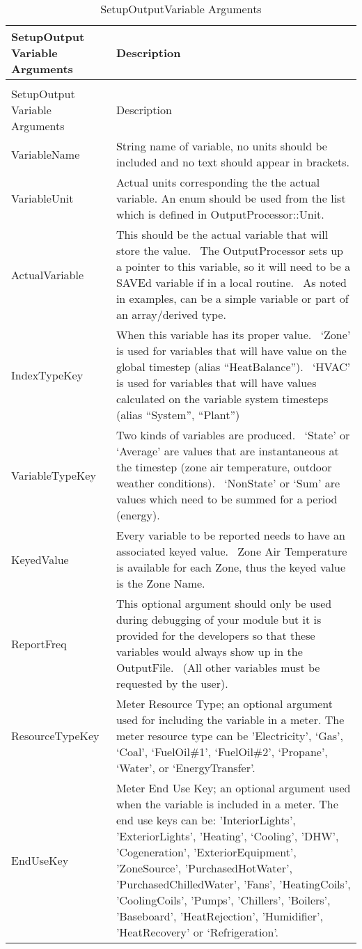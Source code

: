 \begin{longtable}[c]{p{1.5in}p{4.5in}}
\caption{SetupOutputVariable Arguments \label{table:setupoutputvariable-arguments}} \tabularnewline
\toprule 
SetupOutput Variable Arguments & Description \tabularnewline
\midrule
\endfirsthead

\caption[]{SetupOutputVariable Arguments} \tabularnewline
\toprule 
SetupOutput Variable Arguments & Description \tabularnewline
\midrule
\endhead

VariableName & String name of variable, no units should be included and no text should appear in brackets. \tabularnewline
VariableUnit & Actual units corresponding the the actual variable. An enum should be used from the list which is defined in OutputProcessor::Unit. \tabularnewline
ActualVariable & This should be the actual variable that will store the value.~ The OutputProcessor sets up a pointer to this variable, so it will need to be a SAVEd variable if in a local routine.~ As noted in examples, can be a simple variable or part of an array/derived type. \tabularnewline
IndexTypeKey & When this variable has its proper value.~ ‘Zone’ is used for variables that will have value on the global timestep (alias “HeatBalance”).~ ‘HVAC’ is used for variables that will have values calculated on the variable system timesteps (alias “System”, “Plant”) \tabularnewline
VariableTypeKey & Two kinds of variables are produced.~ ‘State’ or ‘Average’ are values that are instantaneous at the timestep (zone air temperature, outdoor weather conditions).~ ‘NonState’ or ‘Sum’ are values which need to be summed for a period (energy). \tabularnewline
KeyedValue & Every variable to be reported needs to have an associated keyed value. ~Zone Air Temperature is available for each Zone, thus the keyed value is the Zone Name. \tabularnewline
ReportFreq & This optional argument should only be used during debugging of your module but it is provided for the developers so that these variables would always show up in the OutputFile.~ (All other variables must be requested by the user). \tabularnewline
ResourceTypeKey & Meter Resource Type; an optional argument used for including the variable in a meter. The meter resource type can be 'Electricity', ‘Gas’, ‘Coal’, ‘FuelOil\#1’, ‘FuelOil\#2’, ‘Propane’, ‘Water’, or ‘EnergyTransfer’. \tabularnewline
EndUseKey & Meter End Use Key; an optional argument used when the variable is included in a meter. The end use keys can be: 'InteriorLights’, 'ExteriorLights', 'Heating', ‘Cooling’, 'DHW', 'Cogeneration', 'ExteriorEquipment', 'ZoneSource', 'PurchasedHotWater', 'PurchasedChilledWater', 'Fans', 'HeatingCoils', 'CoolingCoils', 'Pumps', 'Chillers', 'Boilers', 'Baseboard', 'HeatRejection', 'Humidifier', 'HeatRecovery' or ‘Refrigeration’. \tabularnewline

\end{longtable}
